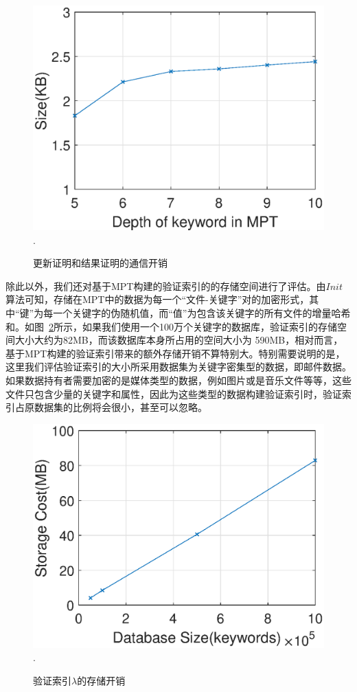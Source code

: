 \begin{figure}[h]
\centering
\includegraphics[width=3.5 in]{expr/proof}
\DeclareGraphicsExtensions.
\caption{更新证明和结果证明的通信开销}
\label{fig:proof}
\end{figure}


除此以外，我们还对基于MPT构建的验证索引的的存储空间进行了评估。由$Init$算法可知，存储在MPT中的数据为每一个“文件-关键字”对的加密形式，其中“键”为每一个关键字的伪随机值，而“值”为包含该关键字的所有文件的增量哈希和。如图~\ref{fig:storage}所示，如果我们使用一个100万个关键字的数据库，验证索引的存储空间大小大约为82MB，而该数据库本身所占用的空间大小为 590MB，相对而言，基于MPT构建的验证索引带来的额外存储开销不算特别大。特别需要说明的是，这里我们评估验证索引的大小所采用数据集为关键字密集型的数据，即邮件数据。如果数据持有者需要加密的是媒体类型的数据，例如图片或是音乐文件等等，这些文件只包含少量的关键字和属性，因此为这些类型的数据构建验证索引时，验证索引占原数据集的比例将会很小，甚至可以忽略。

\begin{figure}[h]
\centering
\includegraphics[width=3.5 in]{expr/storage}
\DeclareGraphicsExtensions.
\caption{验证索引$\lambda$的存储开销 }
\label{fig:storage}
\end{figure}

